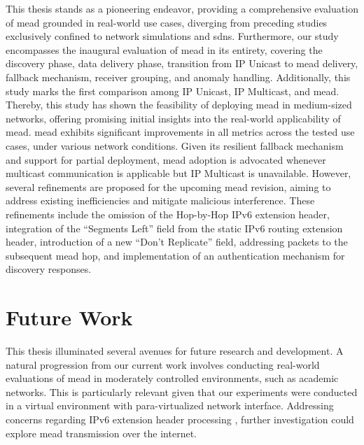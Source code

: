 This thesis stands as a pioneering endeavor, providing a comprehensive
    evaluation of \gls{mead} grounded in real-world use cases, diverging from 
    preceding studies exclusively confined to network simulations and
    \glspl{sdn}.
Furthermore, our study encompasses the inaugural evaluation of \gls{mead} in its
    entirety, covering the discovery phase, data delivery phase, transition
    from IP Unicast to \gls{mead} delivery, fallback mechanism, receiver
    grouping, and anomaly handling.
Additionally, this study marks the first comparison among IP Unicast, IP
    Multicast, and \gls{mead}.
Thereby, this study has shown the feasibility of deploying \gls{mead} in
    medium-sized networks, offering promising initial insights into the
    real-world applicability of \gls{mead}.
\gls{mead} exhibits significant improvements in all metrics across
    the tested use cases, under various network conditions.
Given its resilient fallback mechanism and support for partial
    deployment, \gls{mead} adoption is advocated whenever multicast
    communication is applicable but IP Multicast is unavailable.
However, several refinements are proposed for the upcoming \gls{mead}
    revision, aiming to address existing inefficiencies and mitigate malicious
    interference.
These refinements include the omission of the Hop-by-Hop IPv6 extension header,
    integration of the ``Segments Left'' field from the static IPv6 routing
    extension header, introduction of a new ``Don't Replicate'' field,
    addressing packets to the subsequent \gls{mead} hop, and implementation of
    an authentication mechanism for discovery responses.


\section{Future Work} %
\label{sec:Further Work}
This thesis illuminated several avenues for future research and development.
A natural progression from our current work involves conducting real-world
    evaluations of \gls{mead} in moderately controlled environments, such as
    academic networks.
This is particularly relevant given that our experiments were conducted in a
    virtual environment with para-virtualized network interface.
Addressing concerns regarding IPv6 extension header processing
    \cite{rfc7872_ext_hdrs_drop_rate}, further investigation could explore
    \gls{mead} transmission over the internet.

